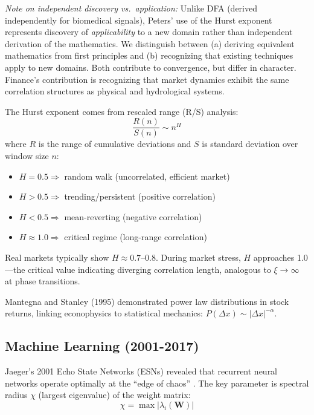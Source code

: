 \documentclass[11pt]{article}
\begin{document}
\textit{Note on independent discovery vs.\ application:} Unlike DFA (derived independently for biomedical signals), Peters' use of the Hurst exponent represents discovery of \textit{applicability} to a new domain rather than independent derivation of the mathematics. We distinguish between (a) deriving equivalent mathematics from first principles and (b) recognizing that existing techniques apply to new domains. Both contribute to convergence, but differ in character. Finance's contribution is recognizing that market dynamics exhibit the same correlation structures as physical and hydrological systems.

The Hurst exponent comes from rescaled range (R/S) analysis:
\begin{equation}
\frac{R(n)}{S(n)} \sim n^H
\end{equation}
where $R$ is the range of cumulative deviations and $S$ is standard deviation over window size $n$:
\begin{itemize}[nosep]
    \item $H = 0.5 \Longrightarrow$ random walk (uncorrelated, efficient market)
    \item $H > 0.5 \Longrightarrow$ trending/persistent (positive correlation)
    \item $H < 0.5 \Longrightarrow$ mean-reverting (negative correlation)
    \item $H \approx 1.0 \Longrightarrow$ critical regime (long-range correlation)
\end{itemize}

Real markets typically show $H \approx 0.7$--$0.8$. During market stress, $H$ approaches 1.0---the critical value indicating diverging correlation length, analogous to $\xi \to \infty$ at phase transitions.

Mantegna and Stanley (1995) \cite{mantegna1995} demonstrated power law distributions in stock returns, linking econophysics to statistical mechanics: $P(\Delta x) \sim |\Delta x|^{-\alpha}$.

\subsection{Machine Learning (2001-2017)}

Jaeger's 2001 Echo State Networks (ESNs) revealed that recurrent neural networks operate optimally at the ``edge of chaos'' \cite{jaeger2001}. The key parameter is spectral radius $\chi$ (largest eigenvalue) of the weight matrix:
\begin{equation}
\chi = \max |\lambda_i(\mathbf{W})|
\end{equation}
\end{document}

